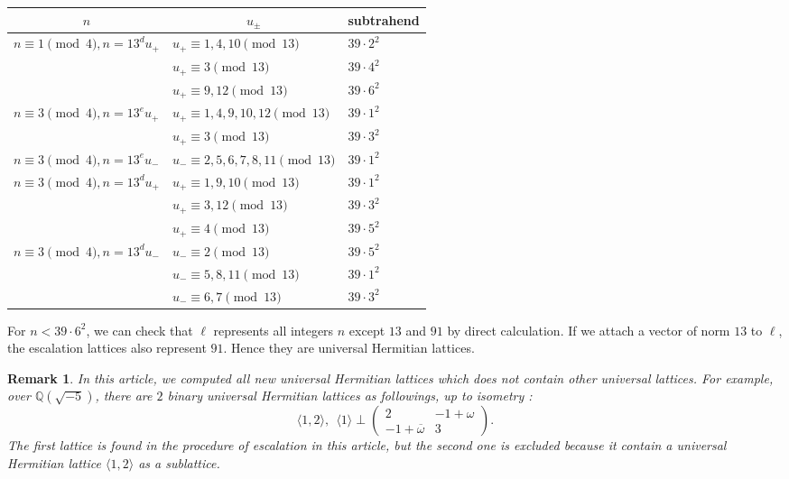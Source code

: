 \documentclass[a4paper,10pt,reqno]{amsart}
\newtheorem{Rmk}{Remark}
\begin{document}
\begin{table}[!h]
\begin{tabular}{l|l|l} \hline\multicolumn{1}{c|}{$n$} & \multicolumn{1}{c|}{$u_{\pm}$} & subtrahend \\ \hline$n \equiv 1 \pmod{4}, n=13^d u_{+}$ &
    $u_{+} \equiv 1,4,10 \pmod{13}$ & $39\cdot 2^2$ \\
~ &
    $u_{+} \equiv 3 \pmod{13}$ & $39\cdot 4^2$ \\
~ &
    $u_{+} \equiv 9,12 \pmod{13}$ & $39\cdot 6^2$ \\ \hline
$n \equiv 3 \pmod{4}, n=13^e u_{+}$ &
    $u_{+} \equiv 1,4,9,10,12 \pmod{13}$ & $39\cdot 1^2$ \\
~ &
    $u_{+} \equiv 3 \pmod{13}$ & $39\cdot 3^2$ \\
    \hline
$n \equiv 3 \pmod{4}, n=13^e u_{-}$ &
    $u_{-} \equiv 2,5,6,7,8,11 \pmod{13}$ & $39\cdot 1^2$ \\
    \hline
$n \equiv 3 \pmod{4}, n=13^d u_{+}$ &
    $u_{+} \equiv 1,9,10 \pmod{13}$ & $39\cdot 1^2$ \\
~ &
    $u_{+} \equiv 3,12 \pmod{13}$ & $39\cdot 3^2$ \\
~ &
    $u_{+} \equiv 4 \pmod{13}$ & $39\cdot 5^2$ \\ \hline
$n \equiv 3 \pmod{4}, n=13^d u_{-}$ &
    $u_{-} \equiv 2 \pmod{13}$ & $39\cdot 5^2$ \\
~ &
    $u_{-} \equiv 5,8,11 \pmod{13}$ & $39\cdot 1^2$ \\
~ &
    $u_{-} \equiv 6,7 \pmod{13}$ & $39\cdot 3^2$ \\ \hline
\end{tabular}
\end{table}

For $n < 39 \cdot 6^2$, we can check that $\ell$ represents all integers $n$ except $13$ and $91$
by direct calculation. If we attach a vector of norm $13$ to $\ell$, the escalation lattices also
represent $91$. Hence they are universal Hermitian lattices.

\begin{Rmk}
In this article, we computed all new universal Hermitian lattices which does not contain other
universal lattices. For example, over ${\mathbb{Q}(\sqrt{{-5}})}$, there are $2$ binary universal Hermitian lattices
as followings, up to isometry \cite{hI_00}:
\[
    {\langle {1,2} \rangle},~~
    {\langle {1} \rangle} \perp {\begin{pmatrix}
  2 & {-1+\omega} \\
  {-1+{\overline{{\omega}}}} & 3
\end{pmatrix}}.
\]
The first lattice is found in the procedure of escalation in this article, but the second one is
excluded because it contain a universal Hermitian lattice ${\langle {1,2} \rangle}$ as a sublattice.
\end{Rmk}
\end{document}
